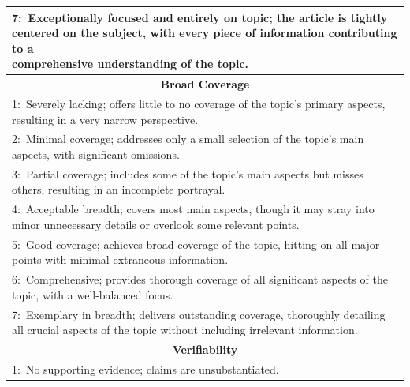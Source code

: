 \documentclass[11pt]{article}
\begin{document}
\begin{table}
{\begin{tabular}{l}
\makecell[l]{7:~Exceptionally focused and entirely on topic; the article is tightly centered on the subject, with every piece of information contributing to a\\ comprehensive understanding of the topic.}  \\ 
\midrule
\multicolumn{1}{c}{\textbf{Broad Coverage}}                                                                                                                                                  \\ 
\midrule
1:~Severely lacking; offers little to no coverage of the topic's primary aspects, resulting in a very narrow perspective.                                                                    \\
2:~Minimal coverage; addresses only a small selection of the topic's main aspects, with significant omissions.                                                                               \\
3:~Partial coverage; includes some of the topic's main aspects but misses others, resulting in an incomplete portrayal.                                                                      \\
4:~Acceptable breadth; covers most main aspects, though it may stray into minor unnecessary details or overlook some relevant points.                                                        \\
5:~Good coverage; achieves broad coverage of the topic, hitting on all major points with minimal extraneous information.                                                                     \\
6:~Comprehensive; provides thorough coverage of all significant aspects of the topic, with a well-balanced focus.                                                                            \\
7:~Exemplary in breadth; delivers outstanding coverage, thoroughly detailing all crucial aspects of the topic without including irrelevant information.                                      \\ 
\midrule
\multicolumn{1}{c}{\textbf{Verifiability}}                                                                                                                                                   \\ 
\midrule
1:~No supporting evidence; claims are unsubstantiated.                                                                                                                                       \\

\end{tabular}}
\end{table}
\end{document}
